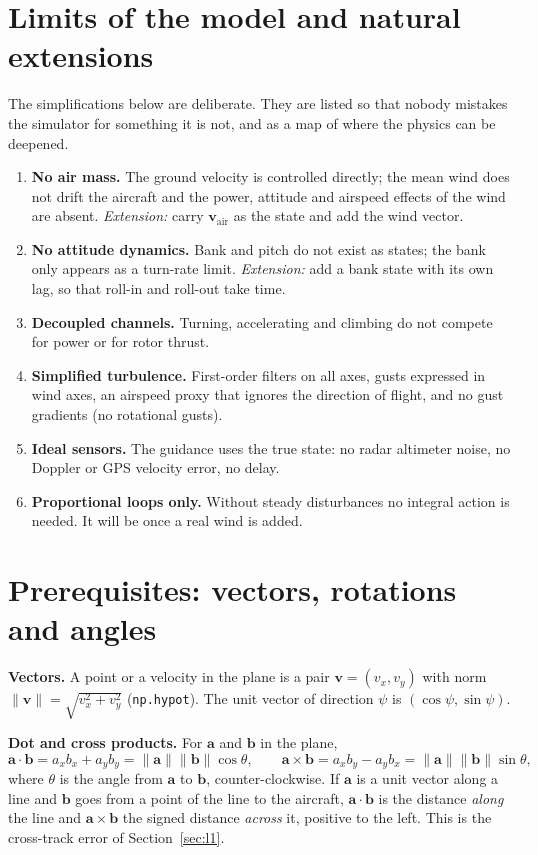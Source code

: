 \documentclass[11pt,a4paper]{article}
\newcommand{\code}[1]{\texttt{#1}}
\begin{document}
\section{Limits of the model and natural extensions}

The simplifications below are deliberate. They are listed so that nobody
mistakes the simulator for something it is not, and as a map of where the
physics can be deepened.

\begin{enumerate}
\item \textbf{No air mass.} The ground velocity is controlled directly; the
mean wind does not drift the aircraft and the power, attitude and airspeed
effects of the wind are absent. \emph{Extension:} carry
$\mathbf v_{\text{air}}$ as the state and add the wind vector.
\item \textbf{No attitude dynamics.} Bank and pitch do not exist as states;
the bank only appears as a turn-rate limit. \emph{Extension:} add a bank state
with its own lag, so that roll-in and roll-out take time.
\item \textbf{Decoupled channels.} Turning, accelerating and climbing do not
compete for power or for rotor thrust.
\item \textbf{Simplified turbulence.} First-order filters on all axes, gusts
expressed in wind axes, an airspeed proxy that ignores the direction of
flight, and no gust gradients (no rotational gusts).
\item \textbf{Ideal sensors.} The guidance uses the true state: no radar
altimeter noise, no Doppler or GPS velocity error, no delay.
\item \textbf{Proportional loops only.} Without steady disturbances no
integral action is needed. It will be once a real wind is added.
\end{enumerate}

\newpage
\appendix
\section{Prerequisites: vectors, rotations and angles}\label{app:vec}

\textbf{Vectors.} A point or a velocity in the plane is a pair
$\mathbf v=(v_x,v_y)$ with norm $\lVert\mathbf v\rVert=\sqrt{v_x^2+v_y^2}$
(\code{np.hypot}). The unit vector of direction $\psi$ is
$(\cos\psi,\sin\psi)$.

\textbf{Dot and cross products.} For $\mathbf a$ and $\mathbf b$ in the plane,
\[
\mathbf a\cdot\mathbf b = a_xb_x+a_yb_y = \lVert\mathbf a\rVert\lVert\mathbf b\rVert\cos\theta,
\qquad
\mathbf a\times\mathbf b = a_xb_y-a_yb_x = \lVert\mathbf a\rVert\lVert\mathbf b\rVert\sin\theta,
\]
where $\theta$ is the angle from $\mathbf a$ to $\mathbf b$,
counter-clockwise. If $\mathbf a$ is a unit vector along a line and
$\mathbf b$ goes from a point of the line to the aircraft, $\mathbf a\cdot\mathbf b$
is the distance \emph{along} the line and $\mathbf a\times\mathbf b$ the signed
distance \emph{across} it, positive to the left. This is the cross-track error
of Section~\ref{sec:l1}.
\end{document}
